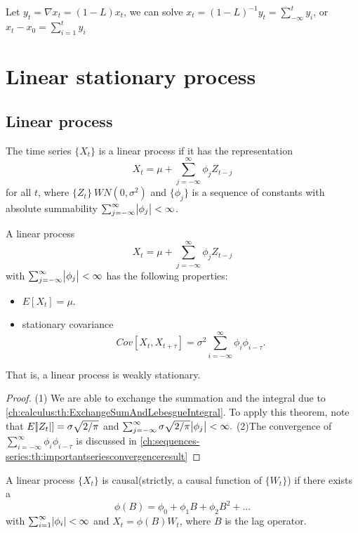 \begin{example}
Let $y_t = \nabla x_t = (1-L)x_t$, we can solve $x_t = (1-L)^{-1}y_t = \sum_{-\infty}^t y_{i}$, or $x_t - x_0 = \sum_{i=1}^t y_{i}$
\end{example}

\section{Linear stationary process}
\subsection{Linear process}
\begin{definition}
\cite[51]{brockwell2002introduction} The time series $\{X_t\}$ is a linear process if it has the representation 
$$X_t = \mu + \sum_{j=-\infty}^\infty \phi_j Z_{t-j}$$
for all $t$, where $\{Z_t\}~WN(0,\sigma^2)$ and $\{\phi_j\}$ is a sequence of constants with absolute summability $\sum_{j=-\infty}^\infty \abs{\phi_j} < \infty$.
\end{definition}

\begin{lemma}\label{ch:time-series-analysis:th:BasicPropertyOfLinearProcess}
A linear process $$X_t = \mu + \sum_{j=-\infty}^\infty \phi_j Z_{t-j}$$
with  $\sum_{j=-\infty}^\infty \abs{\phi_j} < \infty$ has the following properties:	
\begin{itemize}
	\item $E[X_t] = \mu$.
	\item stationary covariance $$Cov[X_t,X_{t+\tau}] = \sigma^2\sum_{i = -\infty}^{\infty} \phi_i\phi_{i-\tau}.$$
\end{itemize}

That is, a linear process is weakly stationary.
\end{lemma}
\begin{proof}
(1) We are able to exchange the summation and the integral due to \autoref{ch:calculus:th:ExchangeSumAndLebesgueIntegral}. To apply this theorem, note that $E[\abs{Z_t}] = \sigma\sqrt{2/\pi}$ and  $\sum_{j=-\infty}^\infty \sigma\sqrt{2/\pi}\abs{\phi_j} < \infty.$
(2)The convergence of $\sum_{i = -\infty}^{\infty} \phi_i\phi_{i-\tau}$ is discussed in \autoref{ch:sequences-series:th:importantseriesconvergenceresult}
\end{proof}

\begin{definition}[causality]
A linear process $\{X_t\}$ is causal(strictly, a causal function of $\{W_t\}$) if there exists a 
$$\phi(B) = \phi_0 + \phi_1 B + \phi_2 B^2 + ...$$
with $\sum_{i=1}^\infty \abs{\phi_i} < \infty$ and $X_t = \phi(B)W_t$, where $B$ is the lag operator.
\end{definition}

